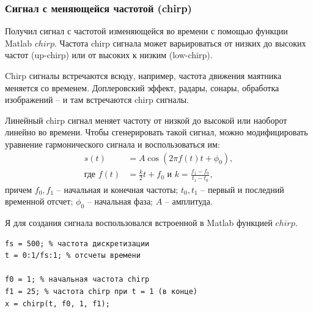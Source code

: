 \documentclass[12pt,a4paper]{article}
\begin{document}
\subsubsection{Сигнал с меняющейся частотой (chirp)}

Получил сигнал с частотой изменяющейся во времени с помощью функции Matlab $chirp$. Частота chirp сигнала может варьироваться от низких до высоких частот (up-chirp) или от высоких к низким (low-chirp).

Chirp сигналы встречаются всюду, например, частота движения маятника меняется со временем. Доплеровский эффект, радары, сонары, обработка изображений -- и там встречаются chirp сигналы.

Линейный chirp сигнал меняет частоту от низкой до высокой или наоборот линейно во времени. Чтобы сгенерировать такой сигнал, можно модифицировать уравнение гармонического сигнала и воспользоваться им:
\begin{equation}
\begin{split}
s\left(t\right)&=A\cos\left(2\pi f\left(t\right)t+\phi_0\right), \\
\text{где }
f\left(t\right)&=\frac{k}{2}t+f_0 \text{ и }
k=\frac{f_1-f_0}{t_1-t_0},
\end{split}
\end{equation}
причем $f_0,f_1$ -- начальная и конечная частоты; $t_0, t_1$ -- первый и последний временной отсчет; $\phi_0$ -- начальная фаза; $A$ -- амплитуда.

Я для создания сигнала воспользовался встроенной в Matlab функцией $chirp$.
\begin{verbatim}
fs = 500; % частота дискретизации
t = 0:1/fs:1; % отсчеты времени
 
f0 = 1; % начальная частота chirp
f1 = 25; % частота chirp при t = 1 (в конце)
x = chirp(t, f0, 1, f1);
\end{verbatim}
\end{document}
